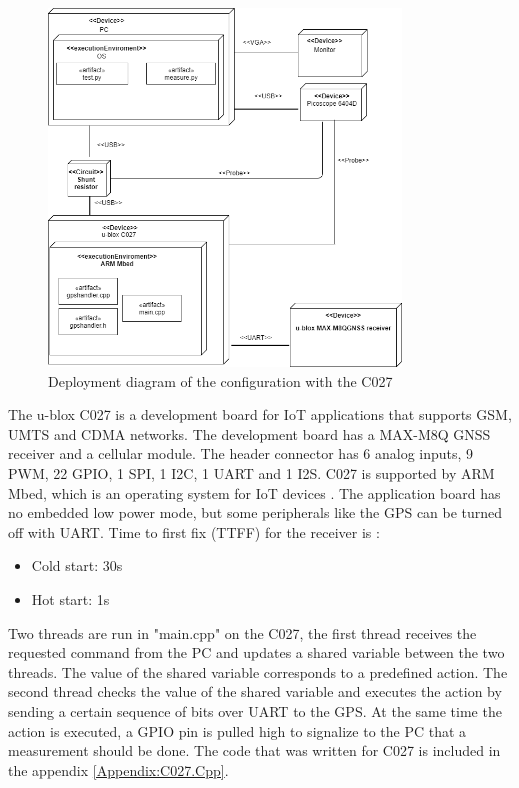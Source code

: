 \begin{figure}[H]
\centering
\includegraphics[height=9.5cm]{Project_Report/Images/C027_deploy.png}
\caption{Deployment diagram of the configuration with the C027}
\label{fig:deploy_C027}
\end{figure}
\vspace{5mm}The u-blox C027 is a development board for IoT applications that supports GSM, UMTS and CDMA networks. The development board has a MAX-M8Q GNSS receiver and a cellular module. The header connector has 6 analog inputs, 9 PWM, 22 GPIO, 1 SPI, 1 I2C, 1 UART and 1 I2S. C027 is supported by ARM Mbed, which is an operating system for IoT devices \cite{C027}. The application board has no embedded low power mode, but some peripherals like the GPS can be turned off with UART. Time to first fix (TTFF) for the receiver is \cite{MAX-M8}:
\begin{itemize}
    \item Cold start: 30s
    \item Hot  start: 1s
\end{itemize}

Two threads are run in "main.cpp" on the C027, the first thread receives the requested command from the PC and updates a shared variable between the two threads. The value of the shared variable corresponds to a predefined action. The second thread checks the value of the shared variable and executes the action by sending a certain sequence of bits over UART to the GPS. At the same time the action is executed, a GPIO pin is pulled high to signalize to the PC that a measurement should be done. The code that was written for C027 is included in the appendix \ref{Appendix:C027.Cpp}. 

